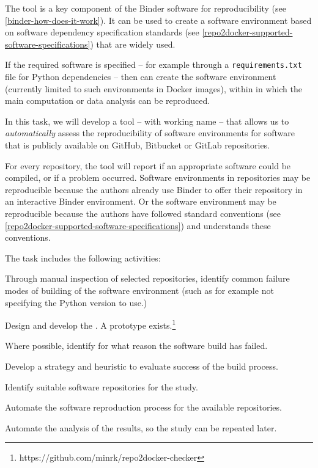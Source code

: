 \begin{task}[
  title=Towards quantifiable progress for reproducible software environments,
  id=repo2docker-checker,
  lead=SRL,
  PM=10,
  wphases={0-24!0.42},
  partners={MP}
  ]
  The \repotodocker{} tool is a key component of the Binder software for
  reproducibility (see \ref{binder-how-does-it-work}). It can be used to create
  a software environment based on software dependency specification standards
  (see \ref{repo2docker-supported-software-specifications}) that are widely used.

  If the required software is specified -- for example through a
  \texttt{requirements.txt} file for Python dependencies -- then \repotodocker{}
  can create the software environment (currently limited to such environments in
  Docker images), within in which the main computation or data analysis can be
  reproduced.

  In this task, we will develop a tool -- with working name
   -- that allows us to \emph{automatically}
  assess the reproducibility of software environments for software that is
  publicly available on GitHub, Bitbucket or GitLab repositories.

  For every repository, the  tool will report if an
  appropriate software could be compiled, or if a problem occurred. Software
  environments in repositories may be reproducible because the authors already
  use Binder to offer their repository in an interactive Binder environment. Or
  the software environment may be reproducible because the authors have followed
  standard conventions (see \ref{repo2docker-supported-software-specifications})
  and \repotodocker{} understands these conventions.

The task includes the following activities:
\begin{compactitem}
  \item Through manual inspection of selected repositories, identify common
    failure modes of building of the software environment (such as for example
    not specifying the Python version to use.)
  \item Design and develop the . A prototype
    exists.\footnote{https://github.com/minrk/repo2docker-checker}
  \item Where possible, identify for what reason the software build has failed.
  \item Develop a strategy and heuristic to evaluate success of the build
    process.
  \item Identify suitable software repositories for the study.
  \item Automate the software reproduction process for the available
    repositories.
  \item Automate the analysis of the results, so the study can be repeated later.
  \end{compactitem}


\end{task}

